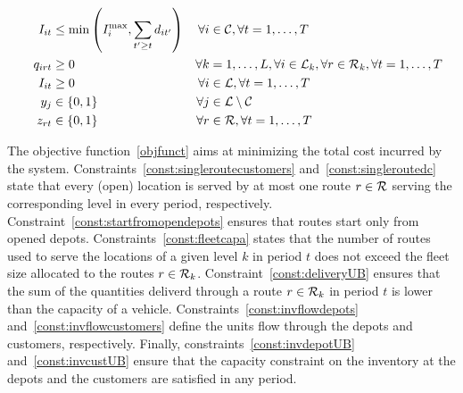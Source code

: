 \documentclass[10pt, a4paper]{article}
\begin{document}
\begin{alignat}{3}
    &&I_{it} 					&\leq \min\left(I_i^{\max}, \sum_{t'\geq t}d_{it'}\right)											&\forall i&\in \mathcal{C}, \forall t=1,\ldots,T\label{const:invcustUB}\\
    &&q_{irt}			&\geq 0 															&\forall k&=1,\ldots,L, \forall i\in \mathcal{L}_k, \forall r\in \mathcal{R}_k,\forall t=1,\ldots, T\label{const:upos}	\\
    &&I_{it}			&\geq 0 															&\forall i &\in \mathcal{L}, \forall t=1,\ldots, T\label{const:invCpos}	\\
    &&y_{j}					& \in \{0,1\} 														&\forall j&\in \mathcal{L}\setminus\mathcal{C}\label{const:ybool}\\	
    &&z_{rt}					&\in \{0,1\} 														&\forall r&\in \mathcal{R}, \forall t=1,\ldots,T\label{const:zbool}
\end{alignat}

The objective function~\eqref{objfunct} aims at minimizing the total cost incurred by the system. 
Constraints~\eqref{const:singleroutecustomers} and~\eqref{const:singleroutedc} state that every (open) location is served by at most one route $r\in\mathcal{R}$ serving the corresponding level in every period, respectively. 
Constraint~\eqref{const:startfromopendepots} ensures that routes start only from opened depots. 
Constraints~\eqref{const:fleetcapa} states that the number of routes used to serve the locations of a given level $k$ in period $t$ does not exceed the fleet size allocated to the routes $r\in\mathcal{R}_k$.
Constraint~\eqref{const:deliveryUB} ensures that the sum of the quantities deliverd through a route $r\in\mathcal{R}_k$ in period $t$ is lower than the capacity of a vehicle. 
Constraints~\eqref{const:invflowdepots} and~\eqref{const:invflowcustomers} define the units flow through the depots and customers, respectively.
Finally, constraints~\eqref{const:invdepotUB} and~\eqref{const:invcustUB} ensure that the capacity constraint on the inventory at the depots and the customers are satisfied in any period. 
\end{document}
